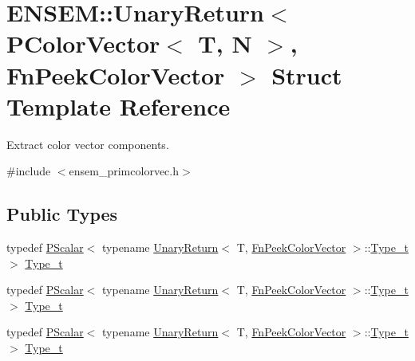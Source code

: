 \hypertarget{structENSEM_1_1UnaryReturn_3_01PColorVector_3_01T_00_01N_01_4_00_01FnPeekColorVector_01_4}{}\section{E\+N\+S\+EM\+:\+:Unary\+Return$<$ P\+Color\+Vector$<$ T, N $>$, Fn\+Peek\+Color\+Vector $>$ Struct Template Reference}
\label{structENSEM_1_1UnaryReturn_3_01PColorVector_3_01T_00_01N_01_4_00_01FnPeekColorVector_01_4}


Extract color vector components.  




{\ttfamily \#include $<$ensem\+\_\+primcolorvec.\+h$>$}

\subsection*{Public Types}
\begin{DoxyCompactItemize}
\item 
typedef \mbox{\hyperlink{classENSEM_1_1PScalar}{P\+Scalar}}$<$ typename \mbox{\hyperlink{structENSEM_1_1UnaryReturn}{Unary\+Return}}$<$ T, \mbox{\hyperlink{structENSEM_1_1FnPeekColorVector}{Fn\+Peek\+Color\+Vector}} $>$\+::\mbox{\hyperlink{structENSEM_1_1UnaryReturn_3_01PColorVector_3_01T_00_01N_01_4_00_01FnPeekColorVector_01_4_a827d146f0d51b63a38339bc9218d64d4}{Type\+\_\+t}} $>$ \mbox{\hyperlink{structENSEM_1_1UnaryReturn_3_01PColorVector_3_01T_00_01N_01_4_00_01FnPeekColorVector_01_4_a827d146f0d51b63a38339bc9218d64d4}{Type\+\_\+t}}
\item 
typedef \mbox{\hyperlink{classENSEM_1_1PScalar}{P\+Scalar}}$<$ typename \mbox{\hyperlink{structENSEM_1_1UnaryReturn}{Unary\+Return}}$<$ T, \mbox{\hyperlink{structENSEM_1_1FnPeekColorVector}{Fn\+Peek\+Color\+Vector}} $>$\+::\mbox{\hyperlink{structENSEM_1_1UnaryReturn_3_01PColorVector_3_01T_00_01N_01_4_00_01FnPeekColorVector_01_4_a827d146f0d51b63a38339bc9218d64d4}{Type\+\_\+t}} $>$ \mbox{\hyperlink{structENSEM_1_1UnaryReturn_3_01PColorVector_3_01T_00_01N_01_4_00_01FnPeekColorVector_01_4_a827d146f0d51b63a38339bc9218d64d4}{Type\+\_\+t}}
\item 
typedef \mbox{\hyperlink{classENSEM_1_1PScalar}{P\+Scalar}}$<$ typename \mbox{\hyperlink{structENSEM_1_1UnaryReturn}{Unary\+Return}}$<$ T, \mbox{\hyperlink{structENSEM_1_1FnPeekColorVector}{Fn\+Peek\+Color\+Vector}} $>$\+::\mbox{\hyperlink{structENSEM_1_1UnaryReturn_3_01PColorVector_3_01T_00_01N_01_4_00_01FnPeekColorVector_01_4_a827d146f0d51b63a38339bc9218d64d4}{Type\+\_\+t}} $>$ \mbox{\hyperlink{structENSEM_1_1UnaryReturn_3_01PColorVector_3_01T_00_01N_01_4_00_01FnPeekColorVector_01_4_a827d146f0d51b63a38339bc9218d64d4}{Type\+\_\+t}}
\end{DoxyCompactItemize}


